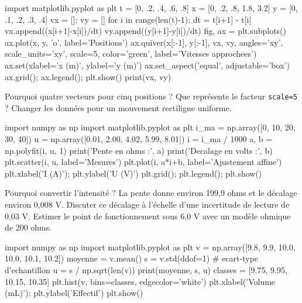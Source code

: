 \begin{python}
import matplotlib.pyplot as plt
t = [0, .2, .4, .6, .8]
x = [0, .2, .8, 1.8, 3.2]
y = [0, .1, .2, .3, .4]
vx = []; vy = []
for i in range(len(t)-1):
    dt = t[i+1] - t[i]
    vx.append((x[i+1]-x[i])/dt)
    vy.append((y[i+1]-y[i])/dt)
fig, ax = plt.subplots()
ax.plot(x, y, 'o', label='Positions')
ax.quiver(x[:-1], y[:-1], vx, vy,
          angles='xy', scale_units='xy', scale=5,
          color='green', label='Vitesses approchees')
ax.set(xlabel='x (m)', ylabel='y (m)')
ax.set_aspect('equal', adjustable='box')
ax.grid(); ax.legend(); plt.show()
print(vx, vy)
\end{python}
Pourquoi quatre vecteurs pour cinq positions ? Que représente le facteur \texttt{scale=5} ? Changer les données pour un mouvement rectiligne uniforme.
\begin{python}
import numpy as np
import matplotlib.pyplot as plt
i_ma = np.array([0, 10, 20, 30, 40])
u = np.array([0.01, 2.00, 4.02, 5.99, 8.01])
i = i_ma / 1000
a, b = np.polyfit(i, u, 1)
print('Pente en ohms :', a)
print('Decalage en volts :', b)
plt.scatter(i, u, label='Mesures')
plt.plot(i, a*i+b, label='Ajustement affine')
plt.xlabel('I (A)'); plt.ylabel('U (V)')
plt.grid(); plt.legend(); plt.show()
\end{python}
Pourquoi convertir l'intensité ? La pente donne environ 199,9 ohms et le décalage environ 0,008 V. Discuter ce décalage à l'échelle d'une incertitude de lecture de 0,03 V. Estimer le point de fonctionnement sous 6,0 V avec un modèle ohmique de 200 ohms.
\begin{python}
import numpy as np
import matplotlib.pyplot as plt
v = np.array([9.8, 9.9, 10.0, 10.0, 10.1, 10.2])
moyenne = v.mean()
s = v.std(ddof=1)  # ecart-type d'echantillon
u = s / np.sqrt(len(v))
print(moyenne, s, u)
classes = [9.75, 9.95, 10.15, 10.35]
plt.hist(v, bins=classes, edgecolor='white')
plt.xlabel('Volume (mL)'); plt.ylabel('Effectif')
plt.show()
\end{python}
